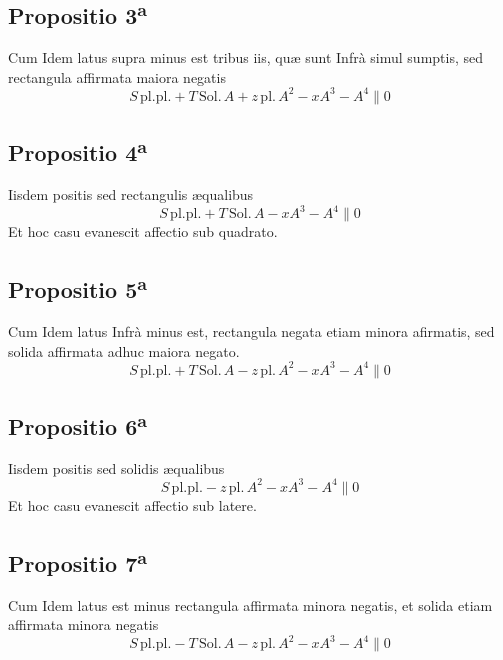 \documentclass[11pt,a4paper]{article}
\begin{document}
\subsection*{Propositio 3\textsuperscript{a}}

Cum Idem latus supra minus est tribus iis, quæ sunt Infrà simul sumptis, sed rectangula affirmata maiora negatis
\[ S\,\mathrm{pl.pl.} + T\,\mathrm{Sol.}\,A + z\,\mathrm{pl.}\,A^{2} - xA^{3} - A^{4} \parallel 0 \]

\subsection*{Propositio 4\textsuperscript{a}}

Iisdem positis sed rectangulis æqualibus
\[ S\,\mathrm{pl.pl.} + T\,\mathrm{Sol.}\,A - xA^{3} - A^{4} \parallel 0 \]
Et hoc casu evanescit affectio sub quadrato.

\subsection*{Propositio 5\textsuperscript{a}}

Cum Idem latus Infrà minus est, rectangula negata etiam minora afirmatis, sed solida affirmata adhuc maiora negato.
\[ S\,\mathrm{pl.pl.} + T\,\mathrm{Sol.}\,A - z\,\mathrm{pl.}\,A^{2} - xA^{3} - A^{4} \parallel 0 \]

\subsection*{Propositio 6\textsuperscript{a}}

Iisdem positis sed solidis æqualibus
\[ S\,\mathrm{pl.pl.} - z\,\mathrm{pl.}\,A^{2} - xA^{3} - A^{4} \parallel 0 \]
Et hoc casu evanescit affectio sub latere.

\subsection*{Propositio 7\textsuperscript{a}}

Cum Idem latus est minus rectangula affirmata minora negatis, et solida etiam affirmata minora negatis
\[ S\,\mathrm{pl.pl.} - T\,\mathrm{Sol.}\,A - z\,\mathrm{pl.}\,A^{2} - xA^{3} - A^{4} \parallel 0 \]
\end{document}
